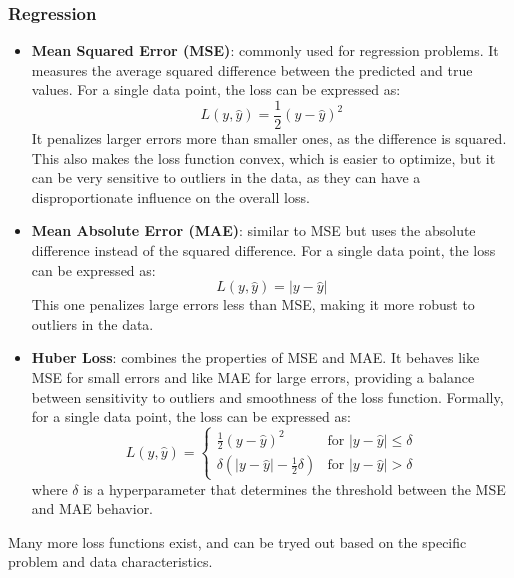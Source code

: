 \subsubsection*{Regression}
\begin{itemize}
    \item \textbf{Mean Squared Error (MSE)}: commonly used for regression problems. It measures the average squared difference between the predicted and true values.
    For a single data point, the loss can be expressed as:
    \begin{equation*}
        L(y, \hat{y}) = \frac{1}{2}(y - \hat{y})^2
    \end{equation*}
    It penalizes larger errors more than smaller ones, as the difference is squared. This also makes the loss function convex, which is easier to optimize,
    but it can be very sensitive to outliers in the data, as they can have a disproportionate influence on the overall loss.

    \item \textbf{Mean Absolute Error (MAE)}: similar to MSE but uses the absolute difference instead of the squared difference.
    For a single data point, the loss can be expressed as:
    \begin{equation*}
        L(y, \hat{y}) = |y - \hat{y}|
    \end{equation*}
    This one penalizes large errors less than MSE, making it more robust to outliers in the data.
    \item \textbf{Huber Loss}: combines the properties of MSE and MAE. It behaves like MSE for small errors and like MAE for large errors, providing a balance between sensitivity to outliers and smoothness of the loss function.
    Formally, for a single data point, the loss can be expressed as:
    \begin{equation*}
        L(y, \hat{y}) = \begin{cases}
        \frac{1}{2}(y - \hat{y})^2 & \text{for } |y - \hat{y}| \leq \delta \\
        \delta (|y - \hat{y}| - \frac{1}{2}\delta) & \text{for } |y - \hat{y}| > \delta
        \end{cases}
    \end{equation*}
    where $\delta$ is a hyperparameter that determines the threshold between the MSE and MAE behavior.
\end{itemize}
Many more loss functions exist, and can be tryed out based on the specific problem and data characteristics.

